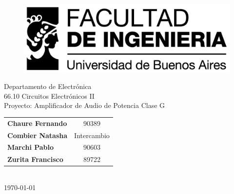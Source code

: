 %
%
\thispagestyle{empty}

\begin{figure}[t]
    \centering
    \includegraphics [scale=0.72]{img/logo_fiuba_alta.jpg}
\end{figure}

\vspace{5.5cm}

\begin{center}
    \Large{Departamento de Electrónica}\\
    \huge{66.10 Circuitos Electrónicos II}\\
    \vspace{.5cm}
    \large{Proyecto: Amplificador de Audio de Potencia Clase G}\\
    \vspace{1cm}
    \begin{tabular}{lc}
    \textbf{Chaure Fernando} & 90389 \\
    \textbf{Combier Natasha} & Intercambio \\    
    \textbf{Marchi Pablo} & 90603 \\
    \textbf{Zurita Francisco} & 89722 \\ 
    \end{tabular}\\
    \vspace{.3cm}
    \small{\today}\\
\end{center}

\vspace{1.5cm}

